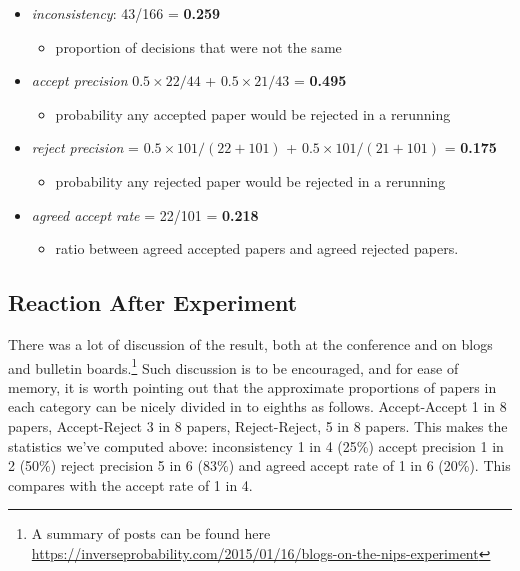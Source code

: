 \begin{itemize}
\tightlist
\item
  \emph{inconsistency}: 43/166 = \textbf{0.259}

  \begin{itemize}
  \tightlist
  \item
    proportion of decisions that were not the same
  \end{itemize}
\item
  \emph{accept precision} \(0.5 \times 22/44\) + \(0.5 \times 21/43\) =
  \textbf{0.495}

  \begin{itemize}
  \tightlist
  \item
    probability any accepted paper would be rejected in a rerunning
  \end{itemize}
\item
  \emph{reject precision} = \(0.5\times 101/(22+101)\) +
  \(0.5\times 101/(21 + 101)\) = \textbf{0.175}

  \begin{itemize}
  \tightlist
  \item
    probability any rejected paper would be rejected in a rerunning
  \end{itemize}
\item
  \emph{agreed accept rate} = 22/101 = \textbf{0.218}
  \begin{itemize}
    \item
  ratio between agreed accepted papers and agreed rejected papers.
  \end{itemize}
\end{itemize}

\subsection{Reaction After Experiment}\label{reaction-after-experiment}

There was a lot of discussion of the result, both at the
conference and on blogs and bulletin boards.\footnote{A summary of posts can be found here \url{https://inverseprobability.com/2015/01/16/blogs-on-the-nips-experiment}} Such discussion is to be
encouraged, and for ease of memory, it is worth pointing out that the
approximate proportions of papers in each category can be nicely divided
in to eighths as follows. Accept-Accept 1 in 8 papers, Accept-Reject 3
in 8 papers, Reject-Reject, 5 in 8 papers. This makes the statistics
we've computed above: inconsistency 1 in 4 (25\%) accept precision 1 in
2 (50\%) reject precision 5 in 6 (83\%) and agreed accept rate of 1 in 6
(20\%). This compares with the accept rate of 1 in 4.

